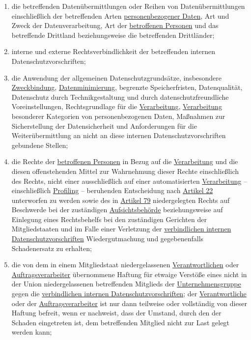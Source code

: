 \begin{enumerate}
\begin{enumerate}
    \item die betreffenden Datenübermittlungen oder Reihen von Datenübermittlungen einschließlich der betreffenden
     Arten
     \hyperref[itm:04-1]{personenbezogener Daten}, Art und Zweck der Datenverarbeitung, Art der \hyperref[itm:04-1]
      {betroffenen Personen} und das betreffende Drittland beziehungsweise die betreffenden Drittländer;
    \label{itm:47-2b}

    \item interne und externe Rechtsverbindlichkeit der betreffenden internen Datenschutzvorschriften;
    \label{itm:47-2c}

    \item die Anwendung der allgemeinen Datenschutzgrundsätze, insbesondere \hyperref[itm:05-1b]
     {Zweckbindung}, \hyperref[itm:05-1c]{Datenminimierung}, begrenzte Speicherfristen, Datenqualität, Datenschutz
     durch Technikgestaltung und durch datenschutzfreundliche Voreinstellungen, Rechtsgrundlage für die \hyperref
     [itm:04-2]{Verarbeitung}, \hyperref[itm:04-2]{Verarbeitung} besonderer Kategorien von personenbezogenen Daten,
     Maßnahmen zur Sicherstellung der Datensicherheit und Anforderungen für die Weiterübermittlung an nicht an diese
     internen Datenschutzvorschriften gebundene Stellen;
    \label{itm:47-2d}

    \item die Rechte der \hyperref[itm:04-1]{betroffenen Personen} in Bezug auf die \hyperref[itm:04-2]
     {Verarbeitung} und die diesen offenstehenden Mittel zur Wahrnehmung dieser Rechte einschließlich des Rechts, nicht
     einer ausschließlich auf einer automatisierten
     \hyperref[itm:04-2]{Verarbeitung} -- einschließlich \hyperref[itm:04-4]{Profiling} -- beruhenden Entscheidung
      nach \hyperref[ch:22]{Artikel 22} unterworfen zu werden sowie des in \hyperref[ch:79]{Artikel 79} niedergelegten
      Rechts auf Beschwerde bei der zuständigen
     \hyperref[itm:04-21]{Aufsichtsbehörde} beziehungsweise auf Einlegung eines Rechtsbehelfs bei den zuständigen
      Gerichten der Mitgliedstaaten und im Falle einer Verletzung der \hyperref[itm:04-20]{verbindlichen internen
      Datenschutzvorschriften} Wiedergutmachung und gegebenenfalls Schadenersatz zu erhalten;
    \label{itm:47-2e}

    \item die von dem in einem Mitgliedstaat niedergelassenen \hyperref[itm:04-7]{Verantwortlichen} oder \hyperref
     [itm:04-8]{Auftragsverarbeiter} übernommene Haftung für etwaige Verstöße eines nicht in der Union niedergelassenen
     betreffenden Mitglieds der
     \hyperref[itm:04-19]{Unternehmensgruppe} gegen die \hyperref[itm:04-20]{verbindlichen internen
      Datenschutzvorschriften}; der \hyperref[itm:04-7]{Verantwortliche} oder der
     \hyperref[itm:04-8]{Auftragsverarbeiter} ist nur dann teilweise oder vollständig von dieser Haftung befreit, wenn
      er nachweist, dass der Umstand, durch den der Schaden eingetreten ist, dem betreffenden Mitglied nicht zur Last
      gelegt werden kann;
    \label{itm:47-2f}


\end{enumerate}
\end{enumerate}

